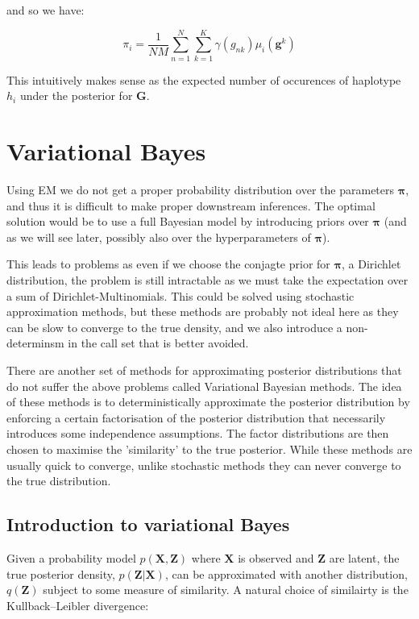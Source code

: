 \documentclass{article}
\begin{document}
and so we have:

\begin{equation} 
   \pi_i = \frac{1}{NM} \sum_{n = 1}^N \sum_{k = 1}^K \gamma(g_{nk}) \mu_i(\boldsymbol{g}^k)
\end{equation}

This intuitively makes sense as the expected number of occurences of haplotype $h_i$ under the posterior for $\boldsymbol{G}$.

\section{Variational Bayes}

Using EM we do not get a proper probability distribution over the parameters $\boldsymbol{\pi}$, and thus it is difficult to make proper downstream inferences. The optimal solution would be to use a full Bayesian model by introducing priors over $\boldsymbol{\pi}$ (and as we will see later, possibly also over the hyperparameters of $\boldsymbol{\pi}$).

This leads to problems as even if we choose the conjagte prior for $\boldsymbol{\pi}$, a Dirichlet distribution, the problem is still intractable as we must take the expectation over a sum of Dirichlet-Multinomials. This could be solved using stochastic approximation methods, but these methods are probably not ideal here as they can be slow to converge to the true density, and we also introduce a non-determinsm in the call set that is better avoided.

There are another set of methods for approximating posterior distributions that do not suffer the above problems called Variational Bayesian methods. The idea of these methods is to deterministically approximate the posterior distribution by enforcing a certain factorisation of the posterior distribution that necessarily introduces some independence assumptions. The factor distributions are then chosen to maximise the 'similarity' to the true posterior. While these methods are usually quick to converge, unlike stochastic methods they can never converge to the true distribution.

\subsection{Introduction to variational Bayes}

Given a probability model $p(\boldsymbol{X}, \boldsymbol{Z})$ where $\boldsymbol{X}$ is observed and $\boldsymbol{Z}$ are latent, the true posterior density, $p(\boldsymbol{Z} | \boldsymbol{X})$, can be approximated with another distribution, $q(\boldsymbol{Z})$ subject to some measure of similarity. A natural choice of similairty is the Kullback–Leibler divergence:
\end{document}
